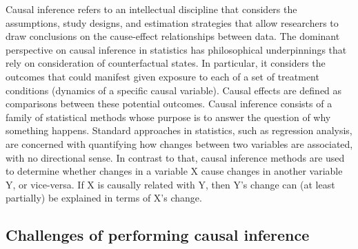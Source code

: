 


Causal inference refers to an intellectual discipline that considers the assumptions, study designs, and estimation strategies that allow researchers to draw conclusions on the cause-effect relationships between data. 
The dominant perspective on causal inference in statistics has philosophical underpinnings that rely on consideration of counterfactual states. 
In particular, it considers the outcomes that could manifest given exposure to each of a set of treatment conditions (dynamics of a specific causal variable). 
Causal effects are defined as comparisons between these potential outcomes. 
Causal inference consists of a family of statistical methods whose purpose is to answer the question of why something happens. 
Standard approaches in statistics, such as regression analysis, are concerned with quantifying how changes between two variables are associated, with no directional sense. 
In contrast to that, causal inference methods are used to determine whether changes in a variable X cause changes in another variable Y, or vice-versa. 
If X is causally related with Y, then Y's change can (at least partially) be explained in terms of X's change.

\subsection{Challenges of performing causal inference}

